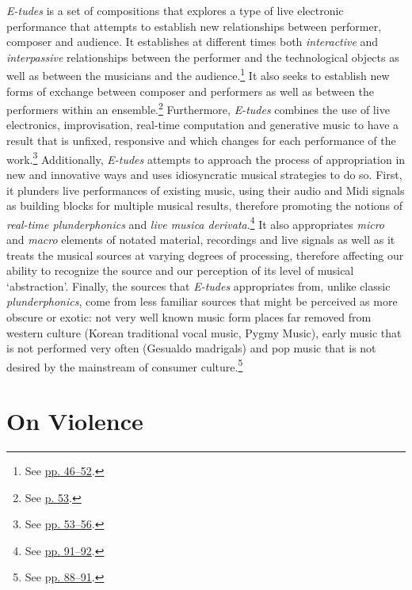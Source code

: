 \emph{E-tudes} is a set of compositions that explores a type of live electronic performance that attempts to establish new relationships between performer, composer and audience. It establishes at different times both \emph{interactive} and \emph{interpassive} relationships between the performer and the technological objects as well as between the musicians and the audience.\footnote{See \hyperlink{relaudience}{pp. 46--52}.} It also seeks to establish new forms of exchange between composer and performers as well as between the performers within an ensemble.\footnote{See \hyperlink{ensembledy}{p. 53}.} Furthermore, \emph{E-tudes} combines the use of live electronics, improvisation, real-time computation and generative music to have a result that is unfixed, responsive and which changes for each performance of the work.\footnote{See \hyperlink{techcomp}{pp. 53--56}.} Additionally, \emph{E-tudes} attempts to approach the process of appropriation in new and innovative ways and uses idiosyncratic musical strategies to do so. First, it plunders live performances of existing music, using their audio and Midi signals as building blocks for multiple musical results, therefore promoting the notions of \emph{real-time plunderphonics} and \emph{live musica derivata}.\footnote{See \hyperlink{realtimeplunderfuck}{pp. 91--92}.} It also appropriates \emph{micro} and \emph{macro} elements of notated material, recordings and live signals as well as it treats the musical sources at varying degrees of processing, therefore affecting our ability to recognize the source and our perception of its level of musical `abstraction'. Finally, the sources that \emph{E-tudes} appropriates from, unlike classic \emph{plunderphonics}, come from less familiar sources that might be perceived as more obscure or exotic: not very well known music form places far removed from western culture (Korean traditional vocal music, Pygmy Music), early music that is not performed very often (Gesualdo madrigals) and pop music that is not desired by the mainstream of consumer culture.\footnote{See \hyperlink{appropstrat}{pp. 88--91}.}

\section{On Violence}
 
